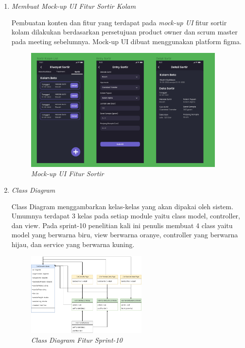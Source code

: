 \begin{enumerate}[listparindent=2em]
	
	\item{\textit{Membuat Mock-up UI Fitur Sortir Kolam}}
	
	Pembuatan konten dan fitur yang terdapat pada \textit{mock-up UI} fitur sortir kolam dilakukan berdasarkan persetujuan product owner dan scrum master pada meeting sebelumnya. Mock-up UI dibuat menggunakan platform figma.
	
	\begin{figure}[H]
	\centering
	\includegraphics[keepaspectratio, width=10cm]{gambar/mockupsortir}
	\caption{\textit{Mock-up UI Fitur Sortir}}
	\label{gambar:mockupsortir}
	\end{figure}

	\item{\textit{Class Diagram}}
	
	Class Diagram menggambarkan kelas-kelas yang akan dipakai oleh sistem. Umumnya terdapat 3 kelas pada setiap module yaitu class model, controller, dan view. Pada sprint-10 penelitian kali ini penulis membuat 4 class yaitu model yang berwarna biru, view berwarna oranye, controller yang berwarna hijau, dan service yang berwarna kuning.
	 
	 \begin{figure}[H]
	 \centering
	 \includegraphics[keepaspectratio, width=6cm]{gambar/transfercd}
	 \caption{\textit{Class Diagram Fitur Sprint-10}}
	 \label{gambar:transfercd}
	 \end{figure}


\end{enumerate}
